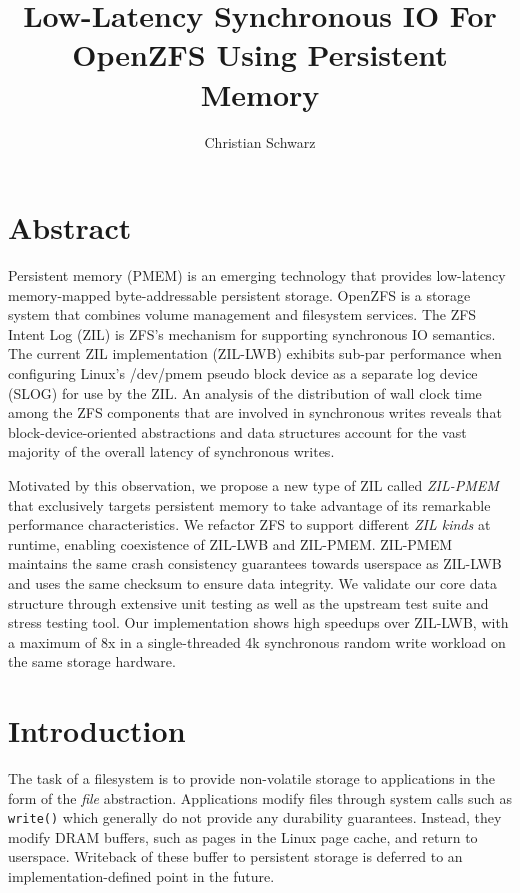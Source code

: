 \documentclass[12pt,a4paper,twoside]{book}
\begin{document}
\frontmatter
{}

\title{Low-Latency Synchronous IO For OpenZFS Using Persistent Memory}
\author{Christian Schwarz}
\maketitle



\chapter{Abstract}
Persistent memory (PMEM) is an emerging technology that provides low-latency memory-mapped byte-addressable persistent storage.
OpenZFS is a storage system that combines volume management and filesystem services.
The ZFS Intent Log (ZIL) is ZFS's mechanism for supporting synchronous IO semantics.
The current ZIL implementation (ZIL-LWB) exhibits sub-par performance when configuring Linux's \mbox{/dev/pmem} pseudo block device as a separate log device (SLOG) for use by the ZIL.
An analysis of the distribution of wall clock time among the ZFS components that are involved in synchronous writes reveals that block-device-oriented abstractions and data structures account for the vast majority of the overall latency of synchronous writes.

Motivated by this observation, we propose a new type of ZIL called \textit{ZIL-PMEM} that exclusively targets persistent memory to take advantage of its remarkable performance characteristics.
We refactor ZFS to support different \textit{ZIL kinds} at runtime, enabling coexistence of ZIL-LWB and ZIL-PMEM.
ZIL-PMEM maintains the same crash consistency guarantees towards userspace as ZIL-LWB and uses the same checksum to ensure data integrity.
We validate our core data structure through extensive unit testing as well as the upstream test suite and stress testing tool.
Our implementation shows high speedups over ZIL-LWB, with a maximum of 8x in a single-threaded 4k synchronous random write workload on the same storage hardware.

\mainmatter

\cleardoublepage
{}
{}
\tableofcontents


\chapter{Introduction}
The task of a filesystem is to provide non-volatile storage to applications in the form of the \textit{file} abstraction.
Applications modify files through system calls such as \lstinline{write()} which generally do not provide any durability guarantees.
Instead, they modify DRAM buffers, such as pages in the Linux page cache, and return to userspace.
Writeback of these buffer to persistent storage is deferred to an implementation-defined point in the future.
\end{document}
